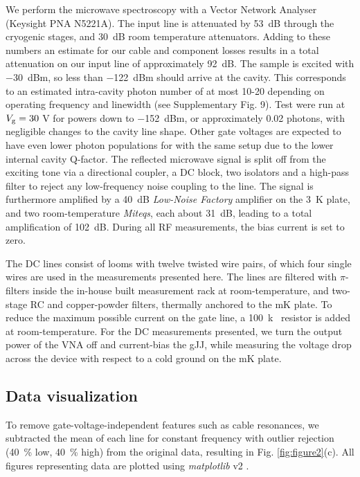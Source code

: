 We perform the microwave spectroscopy with a Vector Network Analyser (Keysight PNA N5221A).
The input line is attenuated by \SI{53}{dB} through the cryogenic stages, and \SI{30}{dB} room temperature attenuators.
Adding to these numbers an estimate for our cable and component losses results in a total attenuation on our input line of approximately \SI{92}{dB}.
The sample is excited with \SI{-30}{dBm}, so less than \SI{-122}{dBm} should arrive at the cavity.
This corresponds to an estimated intra-cavity photon number of at most 10-20 depending on operating frequency and linewidth (see Supplementary Fig. 9).
Test were run at $V_{\rm g} = 30$ V for powers down to \SI{-152}{dBm}, or approximately 0.02 photons, with negligible changes to the cavity line shape.
Other gate voltages are expected to have even lower photon populations for with the same setup due to the lower internal cavity Q-factor.
The reflected microwave signal is split off from the exciting tone via a directional coupler, a DC block, two isolators and a high-pass filter to reject any low-frequency noise coupling to the line.
The signal is furthermore amplified by a \SI{40}{dB} \textit{Low-Noise Factory} amplifier on the \SI{3}{K} plate, and two room-temperature \textit{Miteqs}, each about \SI{31}{dB}, leading to a total amplification of \SI{102}{dB}.
During all RF measurements, the bias current is set to zero.

The DC lines consist of looms with twelve twisted wire pairs, of which four single wires are used in the measurements presented here.
The lines are filtered with $\pi$-filters inside the in-house built measurement rack at room-temperature, and two-stage RC and copper-powder filters, thermally anchored to the mK plate.
To reduce the maximum possible current on the gate line, a \SI{100}{k\Omega} resistor is added at room-temperature.
For the DC measurements presented, we turn the output power of the VNA off and current-bias the gJJ, while measuring the voltage drop across the device with respect to a cold ground on the mK plate.

\subsection*{Data visualization}
To remove gate-voltage-independent features such as cable resonances, we subtracted the mean of each line for constant frequency with outlier rejection (\SI{40}{\percent} low, \SI{40}{\percent} high) from the original data, resulting in Fig. \ref{fig:figure2}(c).
All figures representing data are plotted using \textit{matplotlib} v2 \cite{hunter_matplotlib_2007}.

